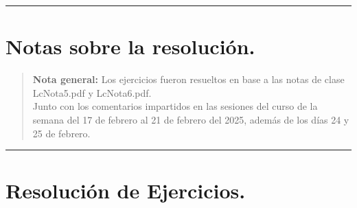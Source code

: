 \documentclass[12pt,letterpaper]{article}
\begin{document}
\bigskip
\hrule height 0.1pt
\bigskip

\section*{Notas sobre la resolución.}

\begin{quote}
  \textbf{Nota general:}  
  Los ejercicios fueron resueltos en base a las notas de clase LcNota5.pdf y LcNota6.pdf.\\
  Junto con los comentarios impartidos en las sesiones del curso de la semana del 17 de febrero  al 21 de febrero del 2025, además de los días 24 y 25 de febrero.
\end{quote}

\bigskip
\hrule height 0.1pt
\bigskip

\section*{Resolución de Ejercicios.}
\end{document}
